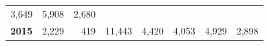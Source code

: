 \documentclass[]{article}
\begin{document}
\begin{longtable}[]{@{}rrrrrrrr@{}}
\begin{minipage}[t]{0.09\columnwidth}
3,649\strut
\end{minipage} & \begin{minipage}[t]{0.08\columnwidth}\raggedleft\strut
5,908\strut
\end{minipage} & \begin{minipage}[t]{0.10\columnwidth}\raggedleft\strut
2,680\strut
\end{minipage}\tabularnewline
\begin{minipage}[t]{0.08\columnwidth}\raggedleft\strut
\textbf{2015}\strut
\end{minipage} & \begin{minipage}[t]{0.10\columnwidth}\raggedleft\strut
2,229\strut
\end{minipage} & \begin{minipage}[t]{0.11\columnwidth}\raggedleft\strut
419\strut
\end{minipage} & \begin{minipage}[t]{0.08\columnwidth}\raggedleft\strut
11,443\strut
\end{minipage} & \begin{minipage}[t]{0.14\columnwidth}\raggedleft\strut
4,420\strut
\end{minipage} & \begin{minipage}[t]{0.09\columnwidth}\raggedleft\strut
4,053\strut
\end{minipage} & \begin{minipage}[t]{0.08\columnwidth}\raggedleft\strut
4,929\strut
\end{minipage} & \begin{minipage}[t]{0.10\columnwidth}\raggedleft\strut
2,898\strut
\end{minipage}\tabularnewline
\bottomrule
\end{longtable}
\end{document}
